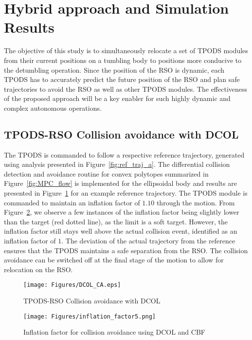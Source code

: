 \section{Hybrid approach and Simulation Results}
The objective of this study is to simultaneously relocate a set of TPODS modules from their current positions on a tumbling body to positions more conducive to the detumbling operation. Since the position of the RSO is dynamic, each TPODS has to accurately predict the future position of the RSO and plan safe trajectories to avoid the RSO as well as other TPODS modules. The effectiveness of the proposed approach will be a key enabler for such highly dynamic and complex autonomous operations. 

\subsection{TPODS-RSO Collision avoidance with DCOL}
The TPODS is commanded to follow a respective reference trajectory, generated using analysis presented in Figure~\ref{fig:ref_traj_a}. The differential collision detection and avoidance routine for convex polytopes summarized in Figure~\ref{fig:MPC_flow} is implemented for the ellipsoidal body and results are presented in Figure~\ref{fig:DCOL_CA} for an example reference trajectory. The TPODS module is commanded to maintain an inflation factor of $1.10$ through the motion. From Figure~\ref{fig:inflation_all}, we observe a few instances of the inflation factor being slightly lower than the target (red dotted line), as the limit is a soft target. However, the inflation factor still stays well above the actual collision event, identified as an inflation factor of $1$. The deviation of the actual trajectory from the reference ensures that the TPODS maintains a safe separation from the RSO. The collision avoidance can be switched off at the final stage of the motion to allow for relocation on the RSO. 

\begin{figure}[!t]
\centerline{\texttt{[image: Figures/DCOL\_CA.eps]}}
\caption{TPODS-RSO Collision avoidance with DCOL}
\label{fig:DCOL_CA}
\end{figure}

\begin{figure}[b!]
    \centerline{\texttt{[image: Figures/inflation\_factor5.png]}}
     \centering
    \caption{Inflation factor for collision avoidance using DCOL and CBF}
    \label{fig:inflation_all}
\end{figure}

